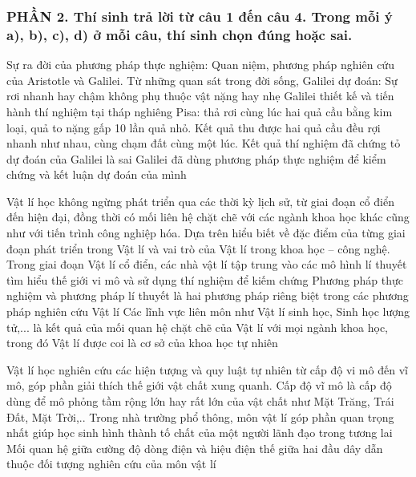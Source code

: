 \subsubsection*{PHẦN 2. Thí sinh trả lời từ câu 1 đến câu 4. Trong mỗi ý a), b), c), d) ở mỗi câu, thí sinh chọn đúng hoặc sai.}
\setcounter{ex}{0}
\begin{ex}%
Sự ra đời của phương pháp thực nghiệm: Quan niệm, phương pháp nghiên cứu của Aristotle và Galilei.
{\True Từ những quan sát trong đời sống, Galilei dự đoán: Sự rơi nhanh hay chậm không phụ thuộc vật nặng hay nhẹ} 
{Galilei thiết kế và tiến hành thí nghiệm tại tháp nghiêng Pisa: thả rơi cùng lúc hai quả cầu bằng kim loại, quả to nặng gấp 10 lần quả nhỏ. Kết quả thu được hai quả cầu đều rợi nhanh như nhau, cùng chạm đất cùng một lúc. Kết quả thí nghiệm đã chứng tỏ dự đoán của Galilei là sai} 
{\True Galilei đã dùng phương pháp thực nghiệm để kiểm chứng và kết luận dự đoán của mình} 
\loigiai{ 
\begin{itemchoice}
\itemch
\itemch
\itemch
\itemch
\end{itemchoice}
}
\end{ex}
\begin{ex}%
Vật lí học không ngừng phát triển qua các thời kỳ lịch sử, từ giai đoạn cổ điển đến hiện đại, đồng thời có mối liên hệ chặt chẽ với các ngành khoa học khác cũng như với tiến trình công nghiệp hóa. Dựa trên hiểu biết về đặc điểm của từng giai đoạn phát triển trong Vật lí và vai trò của Vật lí trong khoa học – công nghệ.
{Trong giai đoạn Vật lí cổ điển, các nhà vật lí tập trung vào các mô hình lí thuyết tìm hiểu thế giới vi mô và sử dụng thí nghiệm để kiếm chứng} 
{Phương pháp thực nghiệm và phương pháp lí thuyết là hai phương pháp riêng biệt trong các phương pháp nghiên cứu Vật lí} 
{\True Các lĩnh vực liên môn như Vật lí sinh học, Sinh học lượng tử,... là kết quả của mối quan hệ chặt chẽ của Vật lí với mọi ngành khoa học, trong đó Vật lí được coi là cơ sở của khoa học tự nhiên} 
\loigiai{ 
\begin{itemchoice}
\itemch
\itemch
\itemch
\itemch
\end{itemchoice}
}
\end{ex}
\begin{ex}%
Vật lí học nghiên cứu các hiện tượng và quy luật tự nhiên từ cấp độ vi mô đến vĩ mô, góp phần giải thích thế giới vật chất xung quanh.
{\True Cấp độ vĩ mô là cấp độ dùng để mô phỏng tầm rộng lớn hay rất lớn của vật chất như Mặt Trăng, Trái Đất, Mặt Trời,..} 
{Trong nhà trường phổ thông, môn vật lí góp phần quan trọng nhất giúp học sinh hình thành tố chất của một người lãnh đạo trong tương lai} 
{\True Mối quan hệ giữa cường độ dòng điện và hiệu điện thế giữa hai đầu dây dẫn thuộc đối tượng nghiên cứu của môn vật lí} 
\loigiai{ 
\begin{itemchoice}
\itemch
\itemch
\itemch
\itemch
\end{itemchoice}
}
\end{ex}
